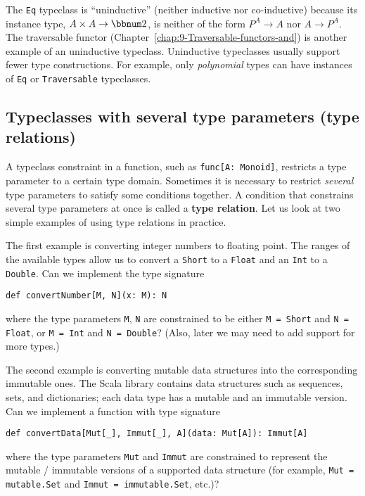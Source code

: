 The \lstinline!Eq! typeclass is \textsf{``}uninductive\textsf{''} (neither inductive
nor co-inductive) because its instance type, $A\times A\rightarrow\bbnum 2$,
is neither of the form $P^{A}\rightarrow A$ nor $A\rightarrow P^{A}$.
The traversable functor (Chapter~\ref{chap:9-Traversable-functors-and})
is another example of an uninductive typeclass. Uninductive typeclasses
usually support fewer type constructions. For example, only \emph{polynomial}
types can have instances of \lstinline!Eq! or \lstinline!Traversable!
typeclasses.

\subsection{Typeclasses with several type parameters (type relations)}

A typeclass constraint in a function, such as \lstinline!func[A: Monoid]!,
restricts a type parameter to a certain type domain. Sometimes it
is necessary to restrict \emph{several} type parameters to satisfy
some conditions together. A condition that constrains several type
parameters at once is called a \textbf{type
relation}. Let us look at two simple examples of using type relations
in practice. 

The first example is converting integer numbers to floating point.
The ranges of the available types allow us to convert a \lstinline!Short!
to a \lstinline!Float! and an \lstinline!Int! to a \lstinline!Double!.
Can we implement the type signature 
\begin{lstlisting}
def convertNumber[M, N](x: M): N
\end{lstlisting}
where the type parameters \lstinline!M!, \lstinline!N! are constrained
to be either \lstinline!M = Short! and \lstinline!N = Float!, or
\lstinline!M = Int! and \lstinline!N = Double!? (Also, later we
may need to add support for more types.)

The second example is converting mutable data structures into the
corresponding immutable ones. The Scala library contains data structures
such as sequences, sets, and dictionaries; each data type has a mutable
and an immutable version. Can we implement a function with type signature
\begin{lstlisting}
def convertData[Mut[_], Immut[_], A](data: Mut[A]): Immut[A]
\end{lstlisting}
where the type parameters \lstinline!Mut! and \lstinline!Immut!
are constrained to represent the mutable / immutable versions of a
supported data structure (for example, \lstinline!Mut = mutable.Set!
and \lstinline!Immut = immutable.Set!, etc.)?


